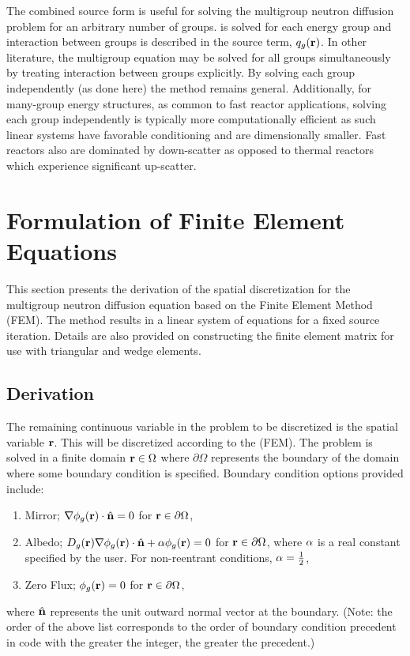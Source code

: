   The combined source form is useful for solving the
  multigroup neutron diffusion problem for an arbitrary number of groups.
  is solved for each energy group and interaction between groups is
  described in the source term, $q_g(\mathbf{r})$. In other literature, the multigroup
  equation may be solved for all groups simultaneously by treating interaction 
  between groups explicitly. By solving each group independently (as done here)
  the method remains general. Additionally, for many-group energy structures, as
  common to fast reactor applications, solving each group independently is 
  typically more computationally efficient as such linear systems have favorable 
  conditioning and are dimensionally smaller. Fast reactors also are dominated
  by down-scatter as opposed to thermal reactors which experience significant
  up-scatter.

\section{Formulation of Finite Element Equations}
  \label{sec:formulation}
  This section presents the derivation of the spatial discretization for the
  multigroup neutron diffusion equation based on the Finite Element Method
  (FEM). The method results in a linear system of equations for a fixed source
  iteration. Details are also provided on constructing the finite element matrix
  for use with triangular and wedge elements.

  \subsection{Derivation}
    \label{sec:formulation:derivation}
    The remaining continuous variable in the problem to be discretized is 
    the spatial variable $\mathbf{r}$. This will be discretized according to the (FEM).
    The problem is solved in a finite domain 
    $\mathbf{r} \in \Omega$ where $\partial \Omega$ represents the boundary of the 
    domain where some boundary condition is specified. Boundary condition 
    options provided include:
    \begin{enumerate}
      \item Mirror; $\mathbf{\nabla} \phi_g(\mathbf{r}) \cdot \hat{\mathbf{n}} = 0$ for 
        $\mathbf{r} \in \partial \Omega$,
      \item Albedo; $D_g(\mathbf{r}) \mathbf{\nabla} \phi_g(\mathbf{r}) \cdot \hat{\mathbf{n}} + 
        \alpha \phi_g(\mathbf{r})=0$ for $\mathbf{r} \in \partial \Omega$,
        where $\alpha$ is a real constant specified
        by the user. For non-reentrant conditions, $\alpha = \frac{1}{2}$,
      \item Zero Flux; $\phi_g(\mathbf{r}) = 0$ for $\mathbf{r} \in \partial \Omega$,
    \end{enumerate}
    where $\hat{\mathbf{n}}$ represents the unit outward normal vector at the boundary.
    (Note: the order of the above list corresponds to the order of boundary 
    condition precedent in code with the greater the integer, the greater the 
    precedent.)
    
